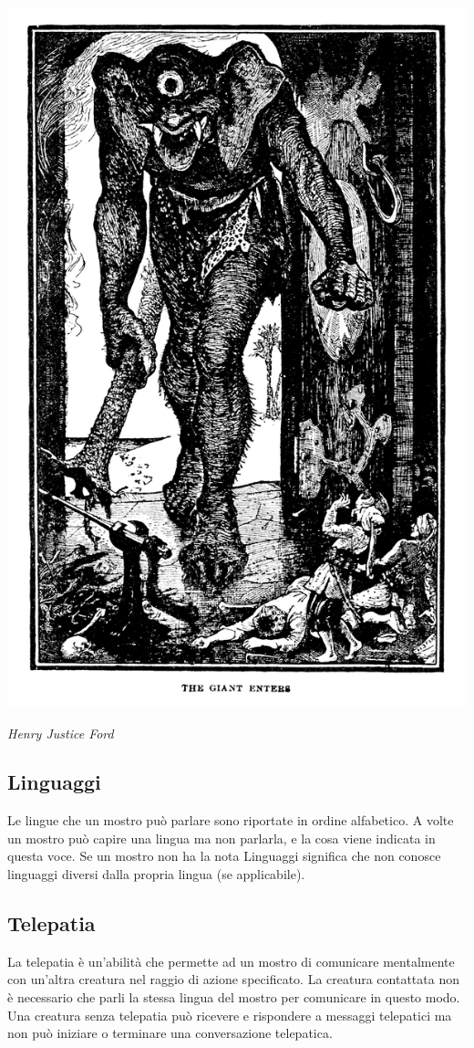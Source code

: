 \begin{multicols}{2}
	\begin{center}
		\includegraphics[width=0.65\linewidth]{immagini/ciclope.png}

		\textit{Henry Justice Ford}
	\end{center}

	\subsection{Linguaggi}

	Le lingue che un mostro può parlare sono riportate in ordine alfabetico. A volte un mostro può capire una lingua ma non parlarla, e la cosa viene indicata in questa voce. Se un mostro non ha la nota Linguaggi significa che non conosce linguaggi diversi dalla propria lingua (se applicabile).

	\subsection{Telepatia}

	La telepatia è un'abilità che permette ad un mostro di comunicare mentalmente con un'altra creatura nel raggio di azione specificato. La creatura contattata non è necessario che parli la stessa lingua del mostro per comunicare in questo modo. Una creatura senza telepatia può ricevere e rispondere a messaggi telepatici ma non può iniziare o terminare una conversazione telepatica.


\end{multicols}
